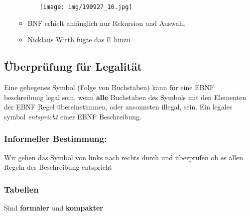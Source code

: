 \documentclass[11pt]{article}
\begin{document}
\begin{enumerate}
\begin{itemize}
\begin{itemize}
\begin{center}
\texttt{[image: img/190927\_10.jpg]}
\end{center}
\end{itemize}

\item BNF erhielt anfänglich nur Rekursion und Auswahl\\
\item Nicklaus Wirth fügte das E hinzu\\
\end{itemize}
\end{enumerate}

\subsection{Überprüfung für Legalität}
\label{sec:orgea8b907}
Eine gebegenes Symbol (Folge von Buchstaben) kann für eine EBNF beschreibung legal sein, wenn \textbf{alle} Buchstaben des Symbols mit den Elementen der EBNF Regel übereinstimmen, oder ansonnsten illegal, sein. Ein legales symbol \emph{entspricht} einer EBNF Beschreibung.\\

\subsubsection{Informeller Bestimmung:}
\label{sec:org3642b21}
Wir gehen das Symbol von links nach rechts durch und überprüfen ob es allen Regeln der Beschreibung entspricht\\

\subsubsection{Tabellen}
\label{sec:orgbb7b0a3}
Sind \textbf{formaler} und \textbf{kompakter}\\
\end{document}
